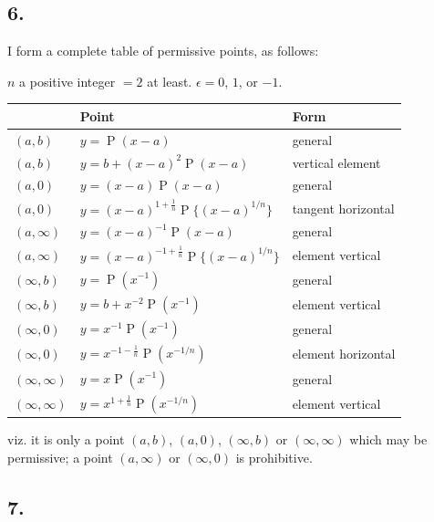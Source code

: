 \documentclass[11pt,a4paper]{article}
\theoremstyle{definition}
\DeclareMathOperator{\Pf}{P}
\begin{document}
\subsection*{6.}

I form a complete table of permissive points, as follows:

$n$ a positive integer $= 2$ at least. $\epsilon = 0$, $1$, or $-1$.

\begin{center}
\begin{tabular}{|l|l|l|}
\hline
 & \textbf{Point} & \textbf{Form} \\
\hline
$(a, b)$ & $y = \Pf(x - a)$ & general \\
$(a, b)$ & $y = b + (x - a)^2 \Pf(x - a)$ & vertical element \\
$(a, 0)$ & $y = (x - a) \Pf(x - a)$ & general \\
$(a, 0)$ & $y = (x - a)^{1 + \frac{1}{n}} \Pf\{(x - a)^{1/n}\}$ & tangent horizontal \\
$(a, \infty)$ & $y = (x - a)^{-1} \Pf(x - a)$ & general \\
$(a, \infty)$ & $y = (x - a)^{-1 + \frac{1}{n}} \Pf\{(x - a)^{1/n}\}$ & element vertical \\
$(\infty, b)$ & $y = \Pf(x^{-1})$ & general \\
$(\infty, b)$ & $y = b + x^{-2} \Pf(x^{-1})$ & element vertical \\
$(\infty, 0)$ & $y = x^{-1} \Pf(x^{-1})$ & general \\
$(\infty, 0)$ & $y = x^{-1 - \frac{1}{n}} \Pf(x^{-1/n})$ & element horizontal \\
$(\infty, \infty)$ & $y = x \Pf(x^{-1})$ & general \\
$(\infty, \infty)$ & $y = x^{1 + \frac{1}{n}} \Pf(x^{-1/n})$ & element vertical \\
\hline
\end{tabular}
\end{center}

viz. it is only a point $(a, b)$, $(a, 0)$, $(\infty, b)$ or $(\infty, \infty)$ which may be permissive; a point $(a, \infty)$ or $(\infty, 0)$ is prohibitive.

\subsection*{7.}
\end{document}
